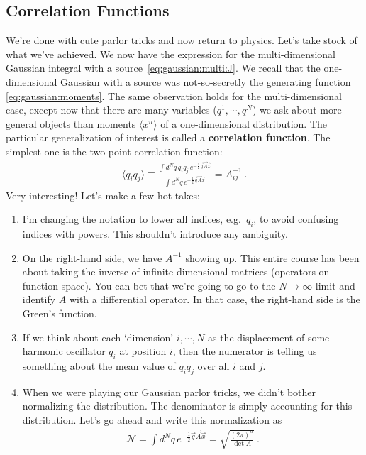 \subsection{Correlation Functions}

We're done with cute parlor tricks and now return to physics. Let's take stock of what we've achieved. We now have the expression for the multi-dimensional Gaussian integral with a source~\eqref{eq:gaussian:multi:J}. We recall that the one-dimensional Gaussian with a source was not-so-secretly the generating function \eqref{eq:gaussian:moments}. The same observation holds for the multi-dimensional case, except now that there are many variables ($q^1, \cdots, q^N$) we ask about more general objects than moments $\langle x^n\rangle$ of a one-dimensional distribution. The particular generalization of interest is called a \textbf{correlation function}. The simplest one is the two-point correlation function:
\begin{align}
	\langle q_i q_j \rangle
	\equiv
	\frac{
		\int d^Nq\, q_iq_j\, e^{-\frac{1}{2} \vec{q}\vec{A}\vec{x}} 
		}{
		\int d^Nq\, e^{-\frac{1}{2} \vec{q}\vec{A}\vec{x}}
		}
	= A^{-1}_{ij} \ .
	\label{eq:multi:Gaussian:2:point}
\end{align}
Very interesting! Let's make a few hot takes:
\begin{enumerate}
\item I'm changing the notation to lower all indices, e.g.~$q_i$, to avoid confusing indices with powers. This shouldn't introduce any ambiguity.
\item On the right-hand side, we have $A^{-1}$ showing up. This entire course has been about taking the inverse of infinite-dimensional matrices (operators on function space). You can bet that we're going to go to the $N\to\infty$ limit and identify $A$ with a differential operator. In that case, the right-hand side is the Green's function. 
\item If we think about each `dimension' $i, \cdots, N$ as the displacement of some harmonic oscillator $q_i$ at position $i$, then the numerator is telling us something about the mean value of $q_iq_j$ over all $i$ and $j$. 
\item When we were playing our Gaussian parlor tricks, we didn't bother normalizing the distribution. The denominator is simply accounting for this distribution. Let's go ahead and write this normalization as
\begin{align}
	\mathcal N 
	= \int d^Nq\, e^{-\frac{1}{2} \vec{q}\vec{A}\vec{x}} 
	= \sqrt{\frac{(2\pi)^n}{\det A}}  
	\ .
\end{align}
\end{enumerate}
